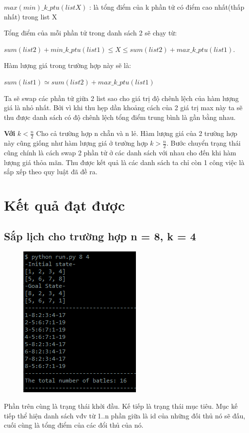 \documentclass[13pt,a4paper]{article}
\begin{document}
\begin{enumerate}
	\item[*] $max(min)\_k\_ptu(listX)$ : là tổng điểm của k phần tử có điểm cao nhất(thấp nhất) trong list X
	\item[] Tổng điểm của mỗi phần tử trong danh sách 2 sẽ chạy từ:
	\begin{center}
	\item[] $sum(list2) + min\_k\_ptu(list1) \leq X \leq sum(list2) + max\_k\_ptu(list1)$.
	\end{center}
	\item[] Hàm lượng giá trong trường hợp này sẽ là:
	\begin{center}
	 $sum(list1) \simeq  sum(list2) + max\_k\_ptu(list1)$
	\end{center}
	\item[] Ta sẽ swap các phần tử giữa 2 list sao cho giá trị độ chênh lệch của hàm lượng giá là nhỏ nhất. Bởi vì khi thu hẹp dần khoảng cách của 2 giá trị max này ta sẽ thu được danh sách có độ chênh lệch tổng điểm trung bình là gần bằng nhau.
	
	\item \textbf{Với} $k < \frac{n}{2}$ Cho cả trường hợp n chẵn và n lẻ. Hàm lượng giá của 2 trường hợp này cũng giống như hàm lượng giá ở trường hợp $k > \frac{n}{2}$. Bước chuyển trạng thái cũng chính là cách swap 2 phần tử ở các danh sách với nhau cho đến khi hàm lượng giá thỏa mãn. Thu được kết quả là các danh sách ta chỉ còn 1 công việc là sắp xếp theo quy luật đã đề ra.
\end{enumerate}

\section{Kết quả đạt được}
\subsection{Sắp lịch cho trường hợp n = 8, k = 4}
	\begin{figure}[H]
		\centering
		\includegraphics[scale=0.7]{./image/kq1.png}
	\end{figure}
	 Phần trên cùng là trạng thái khởi đầu. Kế tiếp là trạng thái mục tiêu. Mục kế tiếp thể hiện danh sách vđv từ 1..n phần giữa là id của những đối thủ nó sẽ đấu, cuối cùng là tổng điểm của các đổi thủ của nó.
	
\end{document}
